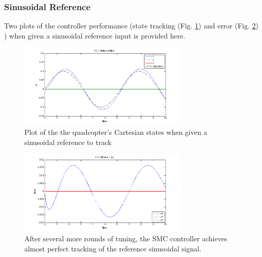 \documentclass[conference]{IEEEtran}
\begin{document}
\subsubsection{Sinusoidal Reference}
Two plots of the controller performance (state tracking (Fig. \ref{fig:smc_5})  and error (Fig. \ref{fig:smc_7}) ) when given a sinusoidal reference input is provided here.
\begin{figure}[!ht]
\centering
\includegraphics[width=3.2in]{../smc_5.png}
\caption{Plot of the the quadcopter's Cartesian states when given a sinusoidal reference to track}
\label{fig:smc_5}
\end{figure}
\begin{figure}[!ht]
\centering
\includegraphics[width=3.2in]{../smc_7.png}
\caption{After several more rounds of tuning, the SMC controller achieves almost perfect tracking of the reference sinusoidal signal.}
\label{fig:smc_7}
\end{figure}
\end{document}
